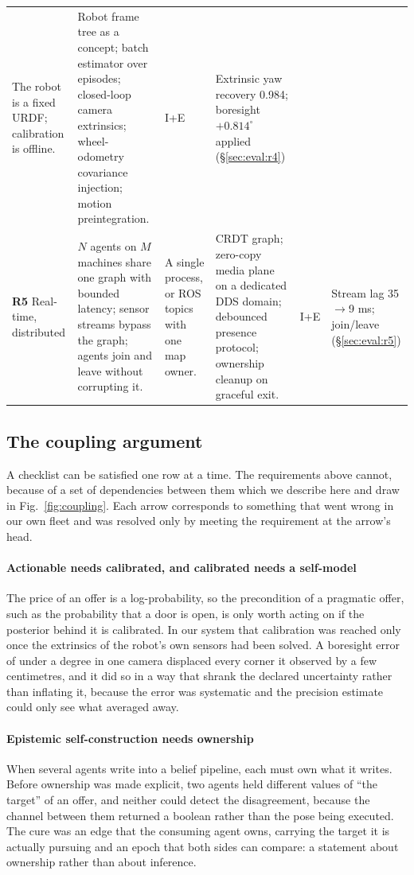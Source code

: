 \documentclass[10pt,twocolumn]{IEEEtran}
\begin{document}
\begin{table}[t]
\begin{tabular}{P{1.4cm}P{3.9cm}P{2.7cm}P{4.4cm}P{1.2cm}P{2.5cm}}
The robot is a fixed URDF; calibration is offline. &
Robot frame tree as a concept; batch estimator over episodes; closed-loop camera extrinsics; wheel-odometry covariance injection; motion preintegration. &
I+E &
Extrinsic yaw recovery 0.984; boresight $+0.814^\circ$ applied (\S\ref{sec:eval:r4}) \\
\addlinespace
\textbf{R5} Real-time, distributed &
$N$ agents on $M$ machines share one graph with bounded latency; sensor streams bypass the graph; agents join and leave without corrupting it. &
A single process, or ROS topics with one map owner. &
CRDT graph; zero-copy media plane on a dedicated DDS domain; debounced presence protocol; ownership cleanup on graceful exit. &
I+E &
Stream lag 35$\to$9 ms; join/leave (\S\ref{sec:eval:r5}) \\
\bottomrule
\end{tabular}
\end{table}

\subsection{The coupling argument}\label{sec:coupling}

A checklist can be satisfied one row at a time. The requirements above cannot, because of a set of
dependencies between them which we describe here and draw in Fig.~\ref{fig:coupling}. Each arrow
corresponds to something that went wrong in our own fleet and was resolved only by meeting the
requirement at the arrow's head.

\paragraph{Actionable needs calibrated, and calibrated needs a self-model} The price of an offer is
a log-probability, so the precondition of a pragmatic offer, such as the probability that a door is
open, is only worth acting on if the posterior behind it is calibrated. In our system that
calibration was reached only once the extrinsics of the robot's own sensors had been solved. A
boresight error of under a degree in one camera displaced every corner it observed by a few
centimetres, and it did so in a way that shrank the declared uncertainty rather than inflating it,
because the error was systematic and the precision estimate could only see what averaged away.

\paragraph{Epistemic self-construction needs ownership} When several agents write into a belief
pipeline, each must own what it writes. Before ownership was made explicit, two agents held different
values of ``the target'' of an offer, and neither could detect the disagreement, because the channel
between them returned a boolean rather than the pose being executed. The cure was an edge that the
consuming agent owns, carrying the target it is actually pursuing and an epoch that both sides can
compare: a statement about ownership rather than about inference.
\end{document}
